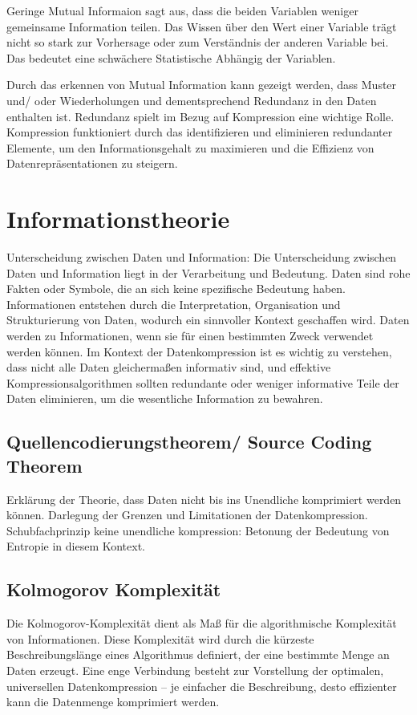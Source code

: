 \documentclass[conference]{IEEEtran}
\begin{document}
Geringe Mutual Informaion sagt aus, dass die beiden Variablen weniger gemeinsame
Information teilen.
Das Wissen über den Wert einer Variable trägt nicht so stark zur
Vorhersage oder zum Verständnis der anderen Variable bei.
Das bedeutet eine schwächere Statistische Abhängig der Variablen.

Durch das erkennen von Mutual Information kann gezeigt werden, dass Muster und/ oder
Wiederholungen und dementsprechend Redundanz in den Daten enthalten ist.
Redundanz spielt im Bezug auf Kompression eine wichtige Rolle.
Kompression funktioniert durch das identifizieren und eliminieren redundanter Elemente,
um den Informationsgehalt zu maximieren und die Effizienz von Datenrepräsentationen
zu steigern.


\section{Informationstheorie}

Unterscheidung zwischen Daten und Information:
Die Unterscheidung zwischen Daten und Information liegt in der
Verarbeitung und Bedeutung.
Daten sind rohe Fakten oder Symbole, die an sich keine spezifische Bedeutung haben.
Informationen entstehen durch die Interpretation, Organisation und Strukturierung
von Daten, wodurch ein sinnvoller Kontext geschaffen wird.
Daten werden zu Informationen, wenn sie für einen bestimmten Zweck verwendet werden können.
Im Kontext der Datenkompression ist es wichtig zu verstehen, dass nicht alle Daten
gleichermaßen informativ sind, und effektive Kompressionsalgorithmen sollten redundante
oder weniger informative Teile der Daten eliminieren, um die wesentliche Information zu
bewahren.


\subsection{Quellencodierungstheorem/ Source Coding Theorem}
Erklärung der Theorie, dass Daten nicht bis ins Unendliche komprimiert werden können.
Darlegung der Grenzen und Limitationen der Datenkompression. Schubfachprinzip
keine unendliche kompression:
Betonung der Bedeutung von Entropie in diesem Kontext.

\subsection{Kolmogorov Komplexität}

Die Kolmogorov-Komplexität dient als Maß für die algorithmische Komplexität von Informationen.
Diese Komplexität wird durch die kürzeste Beschreibungslänge eines Algorithmus definiert,
der eine bestimmte Menge an Daten erzeugt. Eine enge Verbindung besteht zur Vorstellung
der optimalen, universellen Datenkompression – je einfacher die Beschreibung, desto
effizienter kann die Datenmenge komprimiert werden.
\end{document}
